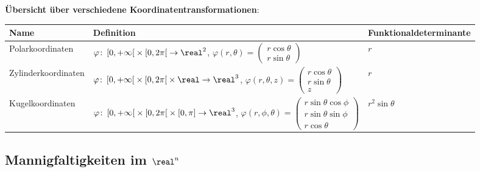 \linie

\textbf{Übersicht über verschiedene Koordinatentransformationen}:

\begin{tabular}{p{40mm}p{66mm}p{50mm}}
    \toprule

    \textbf{Name} & \textbf{Definition} & \textbf{Funktionaldeterminante} \\

    \midrule

    Polarkoordinaten &
    $\varphi\colon \left[0, +\infty\right[ \times \left[0, 2\pi\right[
    \rightarrow \real^2$, \newline
    $\varphi(r, \theta) = \begin{pmatrix}r \cos \theta \\
    r \sin \theta\end{pmatrix}$ &
    $r$ \\

    \midrule

    Zylinderkoordinaten &
    $\varphi\colon \left[0, +\infty\right[ \times
    \left[0, 2\pi\right[ \times \real \rightarrow \real^3$, \newline
    $\varphi(r, \theta, z) = \begin{pmatrix}r \cos \theta \\
    r \sin \theta \\ z\end{pmatrix}$ &
    $r$ \\

    \midrule

    Kugelkoordinaten &
    $\varphi\colon \left[0, +\infty\right[ \times
    \left[0, 2\pi\right[ \times [0, \pi] \rightarrow \real^3$, \newline
    $\varphi(r, \phi, \theta) = \begin{pmatrix}r \sin \theta \cos \phi \\
    r \sin \theta \sin \phi \\ r \cos \theta\end{pmatrix}$ &
    $r^2 \sin \theta$ \\

    \bottomrule
\end{tabular}

\pagebreak

\subsection{%
    \texorpdfstring{Mannigfaltigkeiten im $\real^n$}%
    {Mannigfaltigkeiten im ℝⁿ}%
}

